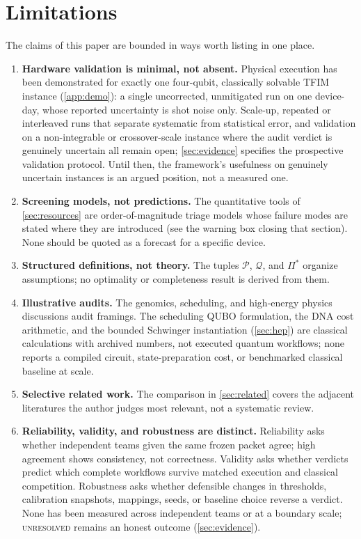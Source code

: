 \section{Limitations}\label{sec:limitations}

The claims of this paper are bounded in ways worth listing in one place.

\begin{enumerate}
  \item \textbf{Hardware validation is minimal, not absent.} Physical execution has been demonstrated for exactly one four-qubit, classically solvable TFIM instance (\cref{app:demo}): a single uncorrected, unmitigated run on one device-day, whose reported uncertainty is shot noise only. Scale-up, repeated or interleaved runs that separate systematic from statistical error, and validation on a non-integrable or crossover-scale instance where the audit verdict is genuinely uncertain all remain open; \cref{sec:evidence} specifies the prospective validation protocol. Until then, the framework's usefulness on genuinely uncertain instances is an argued position, not a measured one.
  \item \textbf{Screening models, not predictions.} The quantitative tools of \cref{sec:resources} are order-of-magnitude triage models whose failure modes are stated where they are introduced (see the warning box closing that section). None should be quoted as a forecast for a specific device.
  \item \textbf{Structured definitions, not theory.} The tuples $\mathcal{P}$, $\mathcal{Q}$, and $\Pi^{*}$ organize assumptions; no optimality or completeness result is derived from them.
  \item \textbf{Illustrative audits.} The genomics, scheduling, and high-energy physics discussions audit framings. The scheduling QUBO formulation, the DNA cost arithmetic, and the bounded Schwinger instantiation (\cref{sec:hep}) are classical calculations with archived numbers, not executed quantum workflows; none reports a compiled circuit, state-preparation cost, or benchmarked classical baseline at scale.
  \item \textbf{Selective related work.} The comparison in \cref{sec:related} covers the adjacent literatures the author judges most relevant, not a systematic review.
  \item \textbf{Reliability, validity, and robustness are distinct.} Reliability asks whether independent teams given the same frozen packet agree; high agreement shows consistency, not correctness. Validity asks whether verdicts predict which complete workflows survive matched execution and classical competition. Robustness asks whether defensible changes in thresholds, calibration snapshots, mappings, seeds, or baseline choice reverse a verdict. None has been measured across independent teams or at a boundary scale; \textsc{unresolved} remains an honest outcome (\cref{sec:evidence}).

\end{enumerate}
